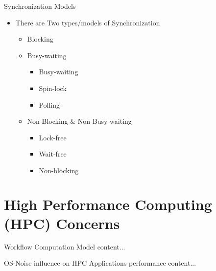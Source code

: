 \documentclass{beamer}
\begin{document}
	\begin{frame}{Synchronization Models}
		\begin{itemize} 
			 \item There are \alert{Two} types/models of Synchronization
			\begin{itemize}
				\vspace{8pt} \item \alert{Blocking}
				\vspace{8pt} \item \alert{Busy-waiting}
				\begin{itemize}
					\vspace{8pt} \item Busy-waiting
					\vspace{8pt} \item Spin-lock
					\vspace{8pt} \item Polling
				\end{itemize}
				\vspace{8pt} \item { \alert{Non-}Blocking \& \alert{Non-}Busy-waiting}
				\begin{itemize}
					\vspace{8pt} \item Lock-free
					\vspace{8pt} \item Wait-free
					\vspace{8pt} \item Non-blocking
				\end{itemize}
			\end{itemize}
		\end{itemize}
	\end{frame}
	
	\section{High Performance Computing (HPC) Concerns}
	\begin{frame}{Workflow Computation Model}
		content...
	\end{frame}
	\begin{frame}{OS-Noise influence on HPC Applications performance}
		content...
	\end{frame}
	
\end{document}
